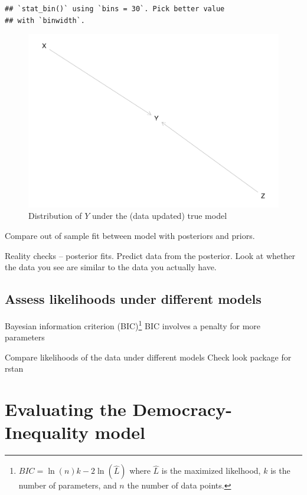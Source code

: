 \documentclass[12pt,]{book}
\let\rmarkdownfootnote\footnote%
\def\footnote{\protect\rmarkdownfootnote}
\begin{document}
\begin{verbatim}
## `stat_bin()` using `bins = 30`. Pick better value
## with `binwidth`.
\end{verbatim}

\begin{figure}
\centering
\includegraphics{ii_files/figure-latex/unnamed-chunk-120-1.pdf}
\caption{\label{fig:unnamed-chunk-120}Distribution of \(Y\) under the (data updated) true model}
\end{figure}

Compare out of sample fit between model with posteriors and priors.

Reality checks -- posterior fits. Predict data from the posterior. Look at whether the data you see are similar to the data you actually have.

\hypertarget{assess-likelihoods-under-different-models}{%
\subsection{Assess likelihoods under different models}\label{assess-likelihoods-under-different-models}}

Bayesian information criterion (BIC)\footnote{\(BIC = \ln(n)k - 2\ln(\hat{L})\) where \(\hat{L}\) is the maximized likelhood, \(k\) is the number of parameters, and \(n\) the number of data points.}
BIC involves a penalty for more parameters

Compare likelihoods of the data under different models
Check look package for rstan

\hypertarget{evaluating-the-democracy-inequality-model}{%
\section{Evaluating the Democracy-Inequality model}\label{evaluating-the-democracy-inequality-model}}
\end{document}
